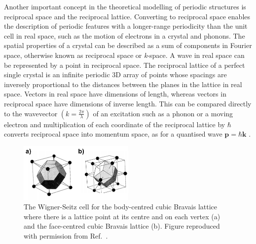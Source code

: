 \documentclass[11pt, twoside]{report}
\begin{document}
Another important concept in the theoretical modelling of periodic structures is reciprocal space and the reciprocal lattice. 
Converting to reciprocal space enables the description of periodic features with a longer-range periodicity than the unit cell in real space, such as the motion of electrons in a crystal and phonons.
The spatial properties of a crystal can be described as a sum of components in Fourier space, otherwise known as reciprocal space or \textit{k}-space. A wave in real space can be represented by a point in reciprocal space. The reciprocal lattice of a perfect single crystal is an infinite periodic 3D array of points whose spacings are inversely proportional to the distances between the planes in the lattice in real space. Vectors in real space have dimensions of length, whereas vectors in reciprocal space have dimensions of inverse length. This can be compared directly to the wavevector $ \left(k  = \frac{2\pi}{\lambda} \right)$ of an excitation such as a phonon or a moving electron and multiplication of each coordinate of the reciprocal lattice by $\hbar$ converts reciprocal space into momentum space, as for a quantised wave $\mathbf{p} = \hbar \mathbf{k}$ \cite{Blakemore1}. 

\begin{figure}[h!]
  \centering
    \includegraphics[width=0.5\textwidth]{figures/Wigner-Seitz.png}
    \caption[The Wigner-Seitz cell for the body-centred cubic Bravais lattice where there is a lattice point at its centre and on each vertex (a) and the face-centred cubic Bravais lattice (b).]{The Wigner-Seitz cell for the body-centred cubic Bravais lattice where there is a lattice point at its centre and on each vertex (a) and the face-centred cubic Bravais lattice (b). 
    Figure reproduced with permission from Ref.~.}
  \label{Wigner-Seitz}
\end{figure}
\end{document}
